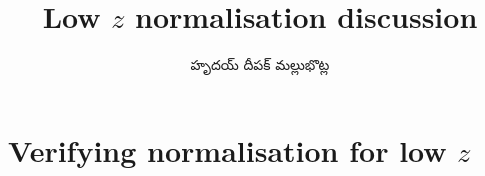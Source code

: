 \documentclass[../main.tex]{subfiles}
\title{Low $z$ normalisation discussion}
\author{\begin{telugu}హృదయ్ దీపక్ మల్లుభొట్ల\end{telugu}}
\date{}
\begin{document}
	\graphicspath{{\main/figures/}}

	\onlyinsubfile{\maketitle}

	\section{Verifying normalisation for low \texorpdfstring{$z$}{z}} \label{sec:lowz:norm}
\end{document}
